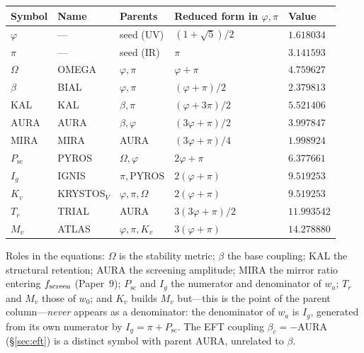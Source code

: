 \documentclass[aps,prd,preprint,amsmath,amssymb,nofootinbib,longbibliography]{revtex4-2}
\begin{document}
\begin{center}
\begin{tabular}{lllll}
\toprule
Symbol & Name & Parents & Reduced form in $\varphi,\pi$ & Value \\
\midrule
$\varphi$   & ---               & seed (UV)              & $(1+\sqrt5)/2$              & $1.618034$  \\
$\pi$       & ---               & seed (IR)              & $\pi$                       & $3.141593$  \\
$\Omega$    & OMEGA             & $\varphi,\pi$          & $\varphi+\pi$               & $4.759627$  \\
$\beta$     & BIAL              & $\varphi,\pi$          & $(\varphi+\pi)/2$           & $2.379813$  \\
$\mathrm{KAL}$  & KAL           & $\beta,\pi$            & $(\varphi+3\pi)/2$          & $5.521406$  \\
$\mathrm{AURA}$ & AURA          & $\beta,\varphi$        & $(3\varphi+\pi)/2$          & $3.997847$  \\
$\mathrm{MIRA}$ & MIRA          & AURA                   & $(3\varphi+\pi)/4$          & $1.998924$  \\
$P_{\mathrm{sc}}$ & PYROS       & $\Omega,\varphi$       & $2\varphi+\pi$              & $6.377661$  \\
$I_g$       & IGNIS             & $\pi,\mathrm{PYROS}$   & $2(\varphi+\pi)$            & $9.519253$  \\
$K_v$       & KRYSTOS$_V$       & $\varphi,\pi,\Omega$   & $2(\varphi+\pi)$            & $9.519253$  \\
$T_r$       & TRIAL             & AURA                   & $3(3\varphi+\pi)/2$         & $11.993542$ \\
$M_v$       & ATLAS             & $\varphi,\pi,K_v$      & $3(\varphi+\pi)$            & $14.278880$ \\
\bottomrule
\end{tabular}
\end{center}

\noindent Roles in the equations: $\Omega$ is the stability metric; $\beta$ the
base coupling; KAL the structural retention; AURA the screening amplitude; MIRA
the mirror ratio entering $f_{\rm screen}$ (Paper~9); $P_{\mathrm{sc}}$ and $I_g$
the numerator and denominator of $w_a$; $T_r$ and $M_v$ those of $w_0$; and $K_v$
builds $M_v$ but---this is the point of the parent column---\emph{never} appears
as a denominator: the denominator of $w_a$ is $I_g$, generated from its own
numerator by $I_g=\pi+P_{\mathrm{sc}}$. The EFT coupling $\beta_c=-\mathrm{AURA}$
(\S\ref{sec:eft}) is a distinct symbol with parent AURA, unrelated to $\beta$.
\end{document}
